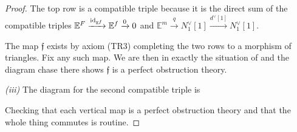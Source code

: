 \begin{proof}
  The top row is a compatible triple because it is the direct sum of the compatible triples \(\mathbb E^F\xrightarrow{\operatorname{id}_{\mathbb E^f}} \mathbb E^f \xrightarrow{0}0\) and \(\mathbb E^m \xrightarrow{q} N_1^\vee[1] \xrightarrow{d^\vee[1]} N_1^\vee[1]\).

  The map \(\mathfrak f\) exists by axiom (TR3) completing the two rows to a morphism of triangles. Fix any such map. We are then in exactly the situation of \cite[Construction 3.13]{manolache_VirtualPullbacks2012} and the diagram chase there shows \(\mathfrak f\) is a perfect obstruction theory.

  \bigskip
  
  \noindent \emph{(iii)} \quad The diagram for the second compatible triple is
  \begin{center}
  \end{center}
  Checking that each vertical map is a perfect obstruction theory and that the whole thing commutes is routine.
\end{proof}
